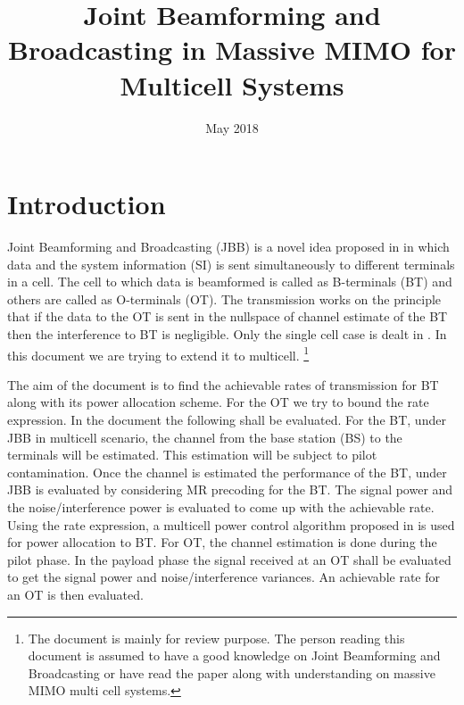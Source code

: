 \documentclass[10pt, a4paper, twoside,fleqn]{article}
\title{Joint Beamforming and Broadcasting in Massive MIMO for Multicell Systems}
\author{}
\date{May 2018}
\begin{document}
\maketitle
 
\section{Introduction}
	Joint Beamforming and Broadcasting (JBB) is a novel idea proposed in \cite{bib:jbb} in which data and the system information (SI) is sent simultaneously to different terminals in a cell. The cell to which data is beamformed is called as B-terminals (BT) and others are called as O-terminals (OT). The transmission works on the principle that if the data to the OT is sent in the nullspace of channel estimate of the BT then the interference to BT is negligible. Only the single cell case is dealt in \cite{bib:jbb}. In this document we are trying to extend it to multicell.
\footnote{The document is mainly for review purpose. The person reading this document is assumed to have a good knowledge on Joint Beamforming and Broadcasting or have read the paper \cite{bib:jbb} along with understanding on massive MIMO multi cell systems.}
	
	The aim of the document is to find the achievable rates of transmission for BT along with its power allocation scheme. For the OT we try to bound the rate expression. In the document the following shall be evaluated. For the BT, under JBB in multicell scenario, the channel from the base station (BS) to the terminals will be estimated. This estimation will be subject to pilot contamination. Once the channel is estimated the performance of the BT, under JBB is evaluated by considering MR precoding for the BT. The signal power and the noise/interference power is evaluated to come up with the achievable rate. Using the rate expression, a multicell power control algorithm proposed in \cite{bib:MassiveMimoBook} is used for power allocation to BT.
     For OT, the channel estimation is done during the pilot phase. In the payload phase the signal received at an OT shall be evaluated to get the signal power and noise/interference variances. An achievable rate for an OT is then evaluated.
\end{document}

